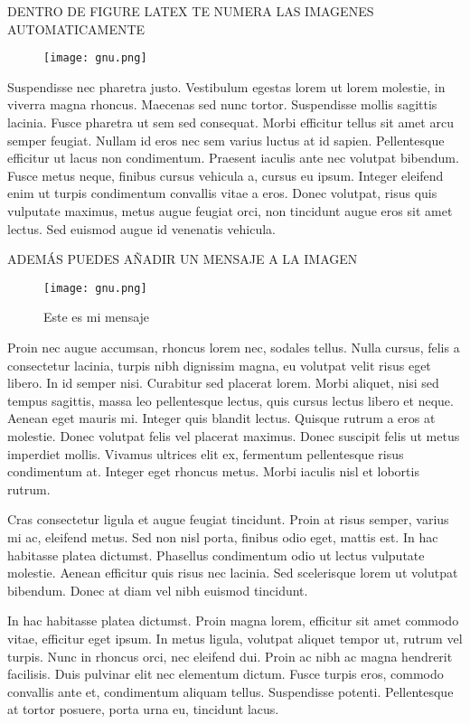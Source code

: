 DENTRO DE FIGURE LATEX TE NUMERA LAS IMAGENES AUTOMATICAMENTE
\begin{figure}
\begin{center}
\texttt{[image: gnu.png]}
\end{center}
\end{figure}

Suspendisse nec pharetra justo. Vestibulum egestas lorem ut lorem molestie, in viverra magna rhoncus. Maecenas sed nunc tortor. Suspendisse mollis sagittis lacinia. Fusce pharetra ut sem sed consequat. Morbi efficitur tellus sit amet arcu semper feugiat. Nullam id eros nec sem varius luctus at id sapien. Pellentesque efficitur ut lacus non condimentum. Praesent iaculis ante nec volutpat bibendum. Fusce metus neque, finibus cursus vehicula a, cursus eu ipsum. Integer eleifend enim ut turpis condimentum convallis vitae a eros. Donec volutpat, risus quis vulputate maximus, metus augue feugiat orci, non tincidunt augue eros sit amet lectus. Sed euismod augue id venenatis vehicula.

ADEMÁS PUEDES AÑADIR UN MENSAJE A LA IMAGEN
\begin{figure}
\begin{center}
\texttt{[image: gnu.png]}
\end{center}
\caption{Este es mi mensaje}
\end{figure}


Proin nec augue accumsan, rhoncus lorem nec, sodales tellus. Nulla cursus, felis a consectetur lacinia, turpis nibh dignissim magna, eu volutpat velit risus eget libero. In id semper nisi. Curabitur sed placerat lorem. Morbi aliquet, nisi sed tempus sagittis, massa leo pellentesque lectus, quis cursus lectus libero et neque. Aenean eget mauris mi. Integer quis blandit lectus. Quisque rutrum a eros at molestie. Donec volutpat felis vel placerat maximus. Donec suscipit felis ut metus imperdiet mollis. Vivamus ultrices elit ex, fermentum pellentesque risus condimentum at. Integer eget rhoncus metus. Morbi iaculis nisl et lobortis rutrum.

Cras consectetur ligula et augue feugiat tincidunt. Proin at risus semper, varius mi ac, eleifend metus. Sed non nisl porta, finibus odio eget, mattis est. In hac habitasse platea dictumst. Phasellus condimentum odio ut lectus vulputate molestie. Aenean efficitur quis risus nec lacinia. Sed scelerisque lorem ut volutpat bibendum. Donec at diam vel nibh euismod tincidunt.

In hac habitasse platea dictumst. Proin magna lorem, efficitur sit amet commodo vitae, efficitur eget ipsum. In metus ligula, volutpat aliquet tempor ut, rutrum vel turpis. Nunc in rhoncus orci, nec eleifend dui. Proin ac nibh ac magna hendrerit facilisis. Duis pulvinar elit nec elementum dictum. Fusce turpis eros, commodo convallis ante et, condimentum aliquam tellus. Suspendisse potenti. Pellentesque at tortor posuere, porta urna eu, tincidunt lacus.

